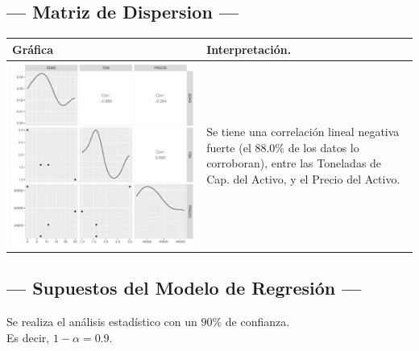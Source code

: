 \subsection{\centering --- Matriz de Dispersion ---} %
\begin{center}
  \begin{tabular}{|p{11cm}|p{5cm}|}
    \hline
    Gráfica & Interpretación. \\ \hline 
    \begin{minipage}{\textwidth}
    \includegraphics[width= 0.5 \linewidth, page=1]{../0.documentos/3_MERGED_MARKET/2_POLIPASTO/r/Rplots.pdf}
    \end{minipage} 
    &
		Se tiene una correlación lineal negativa fuerte (el \(88.0\%\) de los datos lo corroboran),
		entre las Toneladas de Cap. del Activo, y el Precio del Activo.
		\\ \hline 
  \end{tabular}
\end{center} 

\subsection{\centering --- Supuestos del Modelo de Regresión ---} %

Se realiza el análisis estadístico con un \(90\%\) de confianza. \\ 
Es decir, \(1- \alpha = 0.9\).

